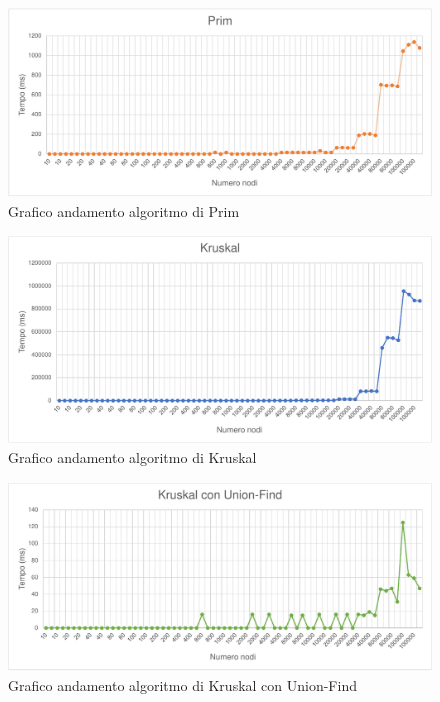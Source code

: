 \documentclass[a4paper]{article}
\begin{document}
\newpage
\begin{figure}[H]
  \centering
  \includegraphics[scale=1]{grafici/prim.pdf}
  \caption{Grafico andamento algoritmo di Prim}
\end{figure}

\begin{figure}[H]
  \centering
  \includegraphics[scale=1]{grafici/kruskal.pdf}
  \caption{Grafico andamento algoritmo di Kruskal}
\end{figure}

\begin{figure}[H]
  \centering
  \includegraphics[scale=1]{grafici/kruskaluf.pdf}
  \caption{Grafico andamento algoritmo di Kruskal con Union-Find}
\end{figure}
\newpage

\end{document}
